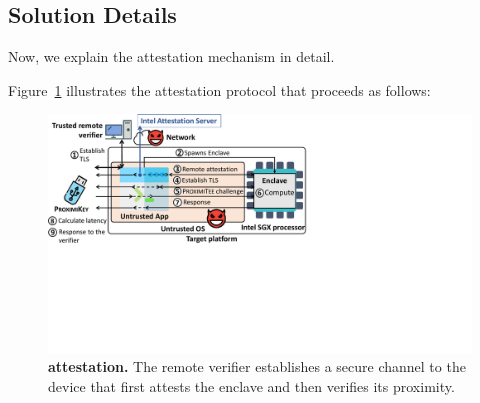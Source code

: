 \subsection{Solution Details}
\label{sec:systemDesign}


Now, we explain the \name attestation mechanism in detail.


 Figure~\ref{fig:systemSetUp} illustrates the attestation protocol that proceeds as follows:


\begin{figure}[t]
 \centering
  \includegraphics[trim={0 8.7cm 13.2cm 0},clip,width=\linewidth]{chapters/ProximiTEE/figures/proximiteeMain.pdf}
 \caption[\name attestation]{\textbf{\name attestation.} The remote verifier establishes a secure channel to the \device device that first attests the enclave and then verifies its proximity.}
 	\label{fig:systemSetUp}
\end{figure}

